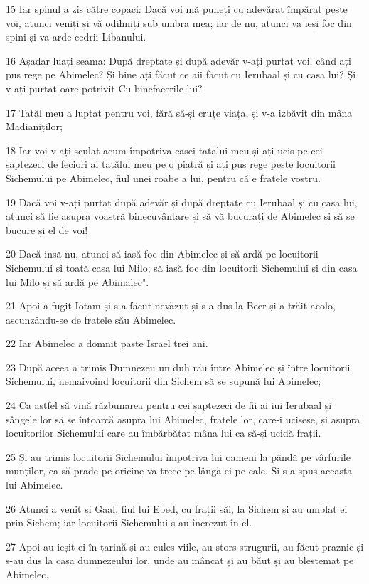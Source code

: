 \par 15 Iar spinul a zis către copaci: Dacă voi mă puneți cu adevărat împărat peste voi, atunci veniți și vă odihniți sub umbra mea; iar de nu, atunci va ieși foc din spini și va arde cedrii Libanului.
\par 16 Așadar luați seama: După dreptate și după adevăr v-ați purtat voi, când ați pus rege pe Abimelec? Și bine ați făcut ce aii făcut cu Ierubaal și cu casa lui? Și v-ați purtat oare potrivit Cu binefacerile lui?
\par 17 Tatăl meu a luptat pentru voi, fără să-și cruțe viața, și v-a izbăvit din mâna Madianiților;
\par 18 Iar voi v-ați sculat acum împotriva casei tatălui meu și ați ucis pe cei șaptezeci de feciori ai tatălui meu pe o piatră și ați pus rege peste locuitorii Sichemului pe Abimelec, fiul unei roabe a lui, pentru că e fratele vostru.
\par 19 Dacă voi v-ați purtat după adevăr și după dreptate cu Ierubaal și cu casa lui, atunci să fie asupra voastră binecuvântare și să vă bucurați de Abimelec și să se bucure și el de voi!
\par 20 Dacă insă nu, atunci să iasă foc din Abimelec și să ardă pe locuitorii Sichemului și toată casa lui Milo; să iasă foc din locuitorii Sichemului și din casa lui Milo și să ardă pe Abimalec".
\par 21 Apoi a fugit Iotam și s-a făcut nevăzut și s-a dus la Beer și a trăit acolo, ascunzându-se de fratele său Abimelec.
\par 22 Iar Abimelec a domnit paste Israel trei ani.
\par 23 După aceea a trimis Dumnezeu un duh rău între Abimelec și între locuitorii Sichemului, nemaivoind locuitorii din Sichem să se supună lui Abimelec;
\par 24 Ca astfel să vină răzbunarea pentru cei șaptezeci de fii ai iui Ierubaal și sângele lor să se întoarcă asupra lui Abimelec, fratele lor, care-i ucisese, și asupra locuitorilor Sichemului care au îmbărbătat mâna lui ca să-și ucidă frații.
\par 25 Și au trimis locuitorii Sichemului împotriva lui oameni la pândă pe vârfurile munților, ca să prade pe oricine va trece pe lângă ei pe cale. Și s-a spus aceasta lui Abimelec.
\par 26 Atunci a venit și Gaal, fiul lui Ebed, cu frații săi, la Sichem și au umblat ei prin Sichem; iar locuitorii Sichemului s-au încrezut în el.
\par 27 Apoi au ieșit ei în țarină și au cules viile, au stors strugurii, au făcut praznic și s-au dus la casa dumnezeului lor, unde au mâncat și au băut și au blestemat pe Abimelec.

